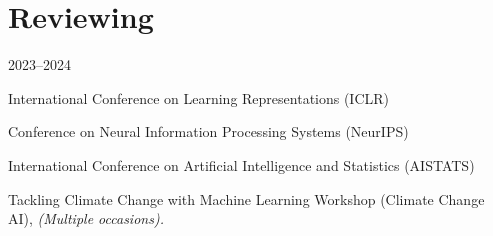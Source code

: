 \section*{Reviewing}
\begin{labeling}{2023--2024}
    \item [2025] International Conference on Learning Representations (ICLR)
    \item [2024] Conference on Neural Information Processing Systems (NeurIPS)
    \item [2023--2024] International Conference on Artificial Intelligence and Statistics (AISTATS)
    \item [2024] Tackling Climate Change with Machine Learning Workshop (Climate Change AI), \textit{(Multiple occasions).}
\end{labeling}

